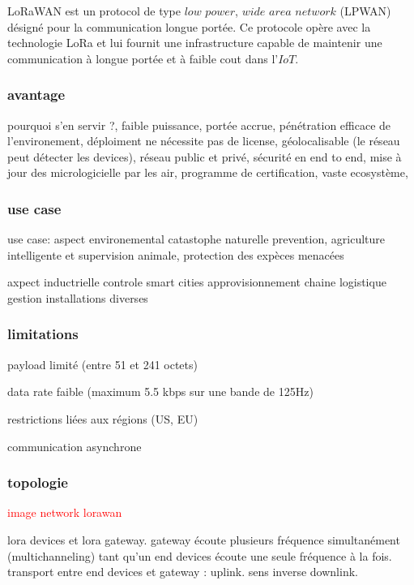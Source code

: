 \documentclass[12pt,a4paper,oneside, titlepage]{report}
\begin{document}
LoRaWAN est un protocol de type $low$ $power$, $wide$ $area$ $network$ (LPWAN) désigné pour la communication longue portée. Ce protocole opère avec la technologie LoRa et lui fournit une infrastructure capable de maintenir une communication à longue portée et à faible cout dans l'$IoT$.

\subsubsection{avantage}

pourquoi s'en servir ?,
faible puissance, 
portée accrue, 
pénétration efficace de l'environement,
déploiment ne nécessite pas de license,
géolocalisable (le réseau peut détecter les devices),
réseau public et privé,
sécurité en end to end,
mise à jour des micrologicielle par les air,
programme de certification,
vaste ecosystème,

\subsubsection{use case}

use case:
aspect environemental 
catastophe naturelle prevention,
agriculture intelligente et supervision animale,
protection des expèces menacées

axpect inductrielle
controle smart cities
approvisionnement chaine logistique
gestion installations diverses

\subsubsection{limitations}

payload limité (entre 51 et 241 octets)

data rate faible (maximum 5.5 kbps sur une bande de 125Hz)

restrictions liées aux régions (US, EU)

communication asynchrone 


\subsubsection{topologie}

\textcolor{red}{image network lorawan}

lora devices et lora gateway. gateway écoute plusieurs fréquence simultanément (multichanneling) tant qu'un end devices écoute une seule fréquence à la fois. transport entre end devices et gateway : uplink. sens inverse downlink.
\end{document}
